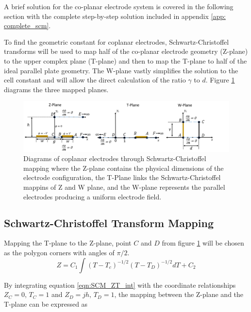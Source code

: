     \par A brief solution for the co-planar electrode system is covered in the following section with the complete step-by-step solution included in appendix \ref{app: complete_scm}.
    
    \par To find the geometric constant for coplanar electrodes, Schwartz-Christoffel transforms will be used to map half of the co-planar electrode geometry (Z-plane) to the upper complex plane (T-plane) and then to map the T-plane to half of the ideal parallel plate geometry. The W-plane vastly simplifies the solution to the cell constant and will allow the direct calculation of the ratio $\gamma$ to $d$. Figure \ref{fig:scm_planes_models} diagrams the three mapped planes. 
  \begin{figure}[h]
        \centering
        \includegraphics[width=\textwidth]{images/scmPlanes.png}
        \caption[Diagrams of coplanar electrodes through Schwartz-Christoffel mapping]{Diagrams of coplanar electrodes through Schwartz-Christoffel mapping where the Z-plane contains the physical dimensions of the electrode configuration, the T-Plane links the Schwartz-Christoffel mappins of Z and W plane, and the W-plane represents the parallel electrodes producing a uniform electrode field.}
        \label{fig:scm_planes_models}
    \end{figure}

\subsection*{Schwartz-Christoffel Transform Mapping}

  \par Mapping the T-plane to the Z-plane, point $C$ and $D$ from figure \ref{fig:scm_planes_models} will be chosen as the polygon corners with angles of $\pi/2$.  
   \begin{equation}
      Z = C_1\int (T-T_c)^{-1/2}(T-T_D)^{-1/2}dT + C_2
      \label{eqn:SCM_ZT_int}
  \end{equation}
  
 \noindent By integrating equation \ref{eqn:SCM_ZT_int} with the coordinate relationships $Z_C = 0$, $T_C = 1$ and $Z_D = jh$, $T_D = 1$, the mapping between the Z-plane and the T-plane can be expressed as
  

